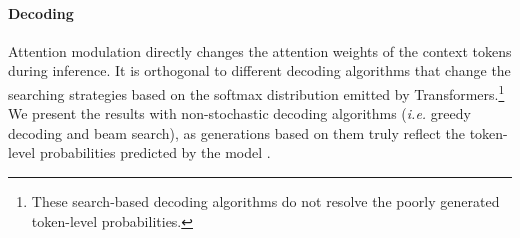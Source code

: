 \documentclass[11pt,a4paper]{article}
\newcommand{\ie}{\textit{i.e.}}
\newcommand{\alg}{attention modulation}
\begin{document}
\begin{table*}[t]
\centering
{} 
\caption{Test results of the fine-tuned GPT2-L w/ and w/o \alg{} on ROCstories with the greedy decoding algorithm. uniq. represent the unique number of tokens generated in the whole test corpus, which measures the number of new unique tokens generated. rel. represent relevancy, which measures the percentage of tokens generated appears in the prompt. rep. measures the sentence-level repetition -- whether two sentences generated are identical.}\label{tab:roc_result}
\end{table*}

\paragraph{Decoding} Attention modulation directly changes the attention weights of the context tokens during inference. It is orthogonal to different decoding algorithms that change the searching strategies based on the softmax distribution emitted by Transformers.\footnote{These search-based decoding algorithms do not resolve the poorly generated token-level probabilities.} We present the results with non-stochastic decoding algorithms (\ie{}  greedy decoding and beam search), as generations based on them truly reflect the token-level probabilities predicted by the model \citep{holtzman-etal-2018-learning}.
\end{document}
